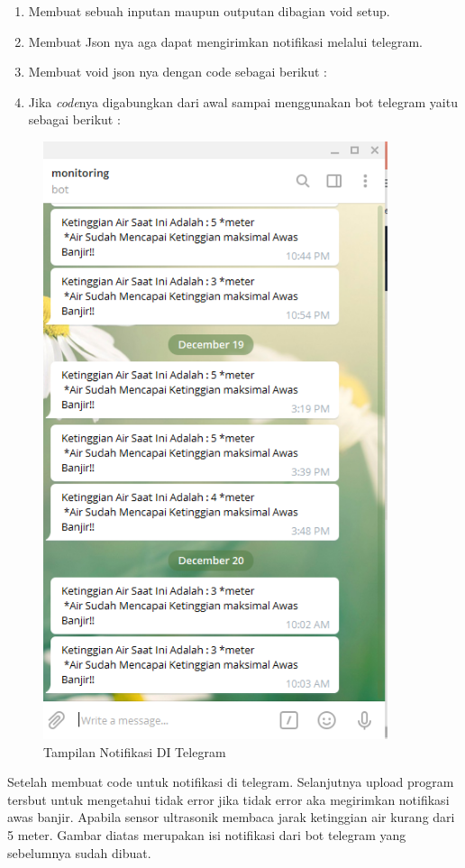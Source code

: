 \begin{enumerate}
\begin{enumerate}
    \item Membuat sebuah inputan maupun outputan dibagian void setup.
    
        
    \item Membuat Json nya aga dapat mengirimkan notifikasi melalui telegram.
    
    \item Membuat void json nya dengan code sebagai berikut :
    
    \item Jika \textit{code}nya digabungkan dari awal sampai menggunakan bot telegram yaitu sebagai berikut :
    
    \end{enumerate}
    
     \begin{figure}[H]
    \centering
    \includegraphics[width=0.9\textwidth]{figures/notif.png}
    \caption{Tampilan Notifikasi DI Telegram}
    \label{print}
    \end{figure}
    \par Setelah membuat code untuk notifikasi di telegram. Selanjutnya upload program tersbut untuk mengetahui tidak error jika tidak error aka megirimkan notifikasi awas banjir. Apabila sensor ultrasonik membaca jarak ketinggian air kurang dari 5 meter. Gambar diatas merupakan isi notifikasi dari bot telegram yang sebelumnya sudah dibuat.
    
 
\end{enumerate}